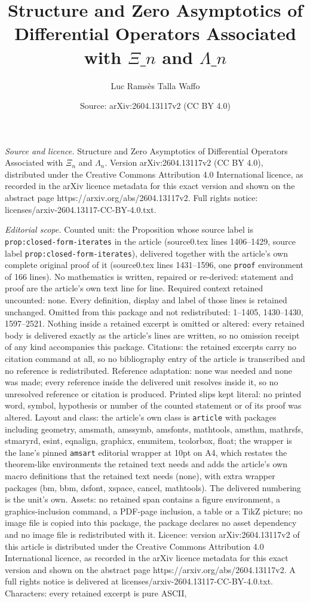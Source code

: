 \documentclass[10pt,a4paper]{amsart}
\title[Structure and Zero Asymptotics of Differential Operators Ass]{Structure and Zero Asymptotics of Differential Operators Associated with ${\Xi}\_n$ and ${\Lambda}\_n$}
\author{Luc Rams\`es Talla Waffo}
\date{Source: arXiv:2604.13117v2 (CC BY 4.0)}
\begin{document}
\maketitle

\noindent\emph{Source and licence.} Structure and Zero Asymptotics of Differential Operators Associated with ${\Xi}_n$ and ${\Lambda}_n$. Version arXiv:2604.13117v2 (CC BY 4.0), distributed under the Creative Commons Attribution 4.0 International licence, as recorded in the arXiv licence metadata for this exact version and shown on the abstract page https://arxiv.org/abs/2604.13117v2. Full rights notice: licenses/arxiv-2604.13117-CC-BY-4.0.txt.\par\smallskip

\noindent\textit{Editorial scope.} Counted unit: the Proposition whose source label is \texttt{prop:closed-form-iterates} in the article (source0.tex lines 1406--1429, source label \texttt{prop:closed-form-iterates}), delivered together with the article's own complete original proof of it (source0.tex lines 1431--1596, one \texttt{proof} environment of 166 lines). No mathematics is written, repaired or re-derived: statement and proof are the article's own text line for line. Required context retained uncounted: none. Every definition, display and label of those lines is retained unchanged. Omitted from this package and not redistributed: 1--1405, 1430--1430, 1597--2521. Nothing inside a retained excerpt is omitted or altered: every retained body is delivered exactly as the article's lines are written, so no omission receipt of any kind accompanies this package. Citations: the retained excerpts carry no citation command at all, so no bibliography entry of the article is transcribed and no reference is redistributed. Reference adaptation: none was needed and none was made; every reference inside the delivered unit resolves inside it, so no unresolved reference or citation is produced. Printed slips kept literal: no printed word, symbol, hypothesis or number of the counted statement or of its proof was altered. Layout and class: the article's own class is \texttt{article} with packages including geometry, amsmath, amssymb, amsfonts, mathtools, amsthm, mathrsfs, stmaryrd, esint, eqnalign, graphicx, enumitem, tcolorbox, float; the wrapper is the lane's pinned \texttt{amsart} editorial wrapper at 10pt on A4, which restates the theorem-like environments the retained text needs and adds the article's own macro definitions that the retained text needs (none), with extra wrapper packages (bm, bbm, dsfont, xspace, cancel, mathtools). The delivered numbering is the unit's own. Assets: no retained span contains a figure environment, a graphics-inclusion command, a PDF-page inclusion, a table or a TikZ picture; no image file is copied into this package, the package declares no asset dependency and no image file is redistributed with it. Licence: version arXiv:2604.13117v2 of this article is distributed under the Creative Commons Attribution 4.0 International licence, as recorded in the arXiv licence metadata for this exact version and shown on the abstract page https://arxiv.org/abs/2604.13117v2. A full rights notice is delivered at licenses/arxiv-2604.13117-CC-BY-4.0.txt. Characters: every retained excerpt is pure ASCII, 
\end{document}
